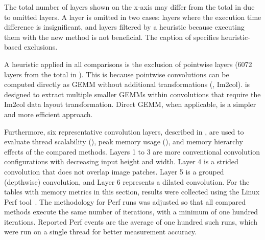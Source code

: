 The total number of layers shown on the x-axis may differ from the total in  due to omitted layers.
A layer is omitted in two cases:
layers where the execution time difference is insignificant, and layers filtered by a heuristic because executing them with the new method is not beneficial.
The caption of  specifies heuristic-based exclusions.

A heuristic applied in all comparisons is the exclusion of pointwise layers (6072 layers from the total in ).
This is because pointwise convolutions can be computed directly as GEMM without additional transformations (\eg, Im2col).
\algname is designed to extract multiple smaller GEMMs within convolutions that require the Im2col data layout transformation.
Direct GEMM, when applicable, is a simpler and more efficient approach.

Furthermore, six representative convolution layers, described in , are used to evaluate thread scalability (), peak memory usage (), and memory hierarchy effects of the compared methods.
Layers 1 to 3 are more conventional convolution configurations with decreasing input height and width.
Layer 4 is a strided convolution that does not overlap image patches.
Layer 5 is a grouped (depthwise) convolution, and Layer 6 represents a dilated convolution.
For the tables with memory metrics in this section, results were collected using the Linux Perf tool~\cite{Perf}.
The methodology for Perf runs was adjusted so that all compared methods execute the same number of iterations, with a minimum of one hundred iterations.
Reported Perf events are the average of one hundred such runs, which were run on a single thread for better measurement accuracy.



